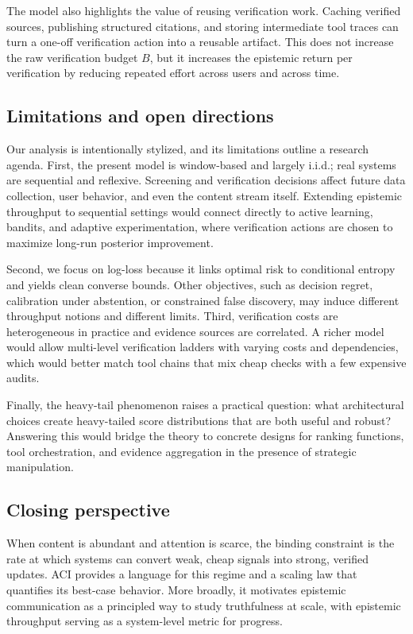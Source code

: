 \documentclass[twocolumn]{scholar7}
\begin{document}
The model also highlights the value of reusing verification work. Caching verified sources, publishing structured citations, and storing intermediate tool traces can turn a one-off verification action into a reusable artifact. This does not increase the raw verification budget \(B\), but it increases the epistemic return per verification by reducing repeated effort across users and across time.

\subsection{Limitations and open directions}
Our analysis is intentionally stylized, and its limitations outline a research agenda. First, the present model is window-based and largely i.i.d.; real systems are sequential and reflexive. Screening and verification decisions affect future data collection, user behavior, and even the content stream itself. Extending epistemic throughput to sequential settings would connect directly to active learning, bandits, and adaptive experimentation, where verification actions are chosen to maximize long-run posterior improvement.

Second, we focus on log-loss because it links optimal risk to conditional entropy and yields clean converse bounds. Other objectives, such as decision regret, calibration under abstention, or constrained false discovery, may induce different throughput notions and different limits. Third, verification costs are heterogeneous in practice and evidence sources are correlated. A richer model would allow multi-level verification ladders with varying costs and dependencies, which would better match tool chains that mix cheap checks with a few expensive audits.

Finally, the heavy-tail phenomenon raises a practical question: what architectural choices create heavy-tailed score distributions that are both useful and robust? Answering this would bridge the theory to concrete designs for ranking functions, tool orchestration, and evidence aggregation in the presence of strategic manipulation.

\subsection{Closing perspective}
When content is abundant and attention is scarce, the binding constraint is the rate at which systems can convert weak, cheap signals into strong, verified updates. ACI provides a language for this regime and a scaling law that quantifies its best-case behavior. More broadly, it motivates epistemic communication as a principled way to study truthfulness at scale, with epistemic throughput serving as a system-level metric for progress.
\end{document}
